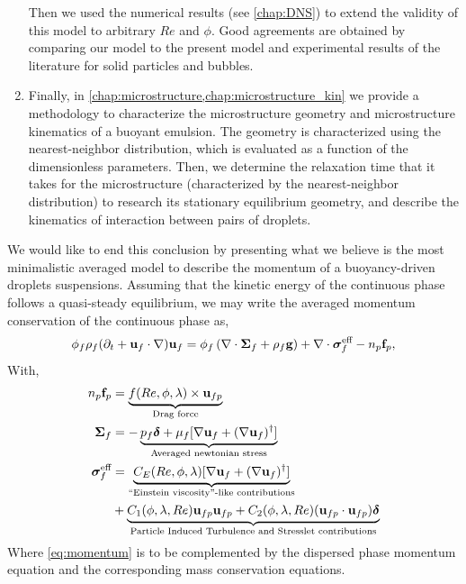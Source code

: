 \begin{enumerate}
    Then we used the numerical results (see \ref{chap:DNS}) to extend the validity of this model to arbitrary $Re$ and $\phi$. 
    Good agreements are obtained by comparing our model to the present model and experimental results of the literature for solid particles and bubbles.  
    \item Finally, in \ref{chap:microstructure,chap:microstructure_kin} we provide a methodology to characterize the microstructure geometry and microstructure kinematics of a buoyant emulsion. 
    The geometry is characterized using the nearest-neighbor distribution, which is evaluated as a function of the dimensionless parameters. 
    Then, we determine the relaxation time that it takes for the microstructure (characterized by the nearest-neighbor distribution) to research its stationary equilibrium geometry, and describe the kinematics of interaction between pairs of droplets. 
\end{enumerate}

We would like to end this conclusion by presenting what we believe is the most minimalistic averaged model to describe the momentum of a buoyancy-driven droplets suspensions. 
Assuming that the kinetic energy of the continuous phase follows a quasi-steady equilibrium, we may write the averaged momentum conservation of the continuous phase as, 
\begin{align}
    \phi_f\rho_f (\pddt + \textbf{u}_f\cdot \grad)\textbf{u}_f
    = \phi_f 
    \left(\div \bm{\Sigma}_f
    + \rho_f \textbf{g}\right)
    + \div  \bm{\sigma}_f^{\text{eff}}
    - n_p \textbf{f}_p,
    \label{eq:momentum}
\end{align}
With, 
\begin{align}
    n_p \textbf{f}_p  
    &= 
    \underbrace{f(Re,\phi, \lambda) \times \textbf{u}_{fp}}_\text{Drag force}
    \label{eq:draggggg}
    \\
    \label{eq:newtonian}
  \bm\Sigma_f &= - \underbrace{p_f \bm\delta + \mu_f [\grad \textbf{u}_f +  (\grad \textbf{u}_f)^\dagger ]}_\text{Averaged newtonian stress} 
  \\
    \bm{\sigma}^{\text{eff}}_f 
    &= \underbrace{ C_E(Re,\phi,\lambda)  [\grad \textbf{u}_f +  (\grad \textbf{u}_f)^\dagger ] }_\text{``Einstein viscosity''-like contributions}
    \nonumber\\
    &+ 
    \underbrace{
      C_1(\phi,\lambda,Re)\textbf{u}_{fp}\textbf{u}_{fp}
      +  C_2(\phi,\lambda,Re)(\textbf{u}_{fp}\cdot \textbf{u}_{fp})     \bm\delta}_\text{Particle Induced Turbulence and Stresslet contributions}
    \label{eq:stress}
\end{align}
Where \ref{eq:momentum} is to be complemented by the dispersed phase momentum equation and the corresponding mass conservation equations. 


